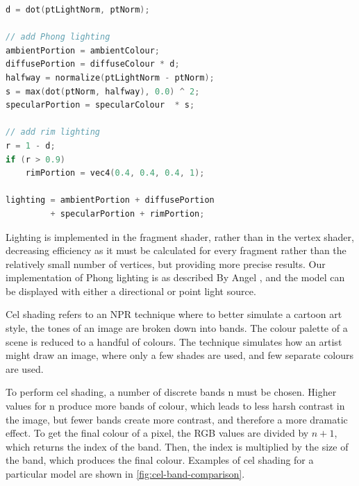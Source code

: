 \begin{lstlisting}[language=C]
d = dot(ptLightNorm, ptNorm);

// add Phong lighting
ambientPortion = ambientColour;
diffusePortion = diffuseColour * d;
halfway = normalize(ptLightNorm - ptNorm);
s = max(dot(ptNorm, halfway), 0.0) ^ 2;
specularPortion = specularColour  * s;

// add rim lighting
r = 1 - d;
if (r > 0.9)
    rimPortion = vec4(0.4, 0.4, 0.4, 1);

lighting = ambientPortion + diffusePortion
         + specularPortion + rimPortion;
\end{lstlisting}

Lighting is implemented in the fragment shader, rather than in the vertex shader, decreasing efficiency as it must be calculated for every fragment rather than the relatively small number of vertices, but providing more precise results. Our implementation of Phong lighting is as described By Angel \cite{texbook}, and the model can be displayed with either a directional or point light source.

Cel shading refers to an NPR technique where to better simulate a cartoon art style, the tones of 
an image are broken down into bands. The colour palette of a scene is reduced to a handful of colours.
The technique simulates how an artist might draw an image, where only a few shades are used, and few
separate colours are used.

To perform cel shading, a number of discrete bands n must be chosen. Higher values for n produce more 
bands of colour, which leads to less harsh contrast in the image, but fewer bands create more contrast,
and therefore a more dramatic effect. To get the final colour of a pixel, the RGB values are divided by
$n+1$, which returns the index of the band. Then, the index is multiplied by the size of the band, which
produces the final colour. Examples of cel shading for a particular model are shown in 
\autoref{fig:cel-band-comparison}. 

